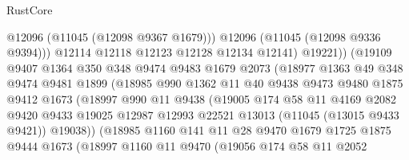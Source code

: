 \begin{lexlean}{RustCore}
\begin{coremodule}
                              @12096
                              (@11045 (@12098 @9367 @1679)))
                            @12096
                            (@11045 (@12098 @9336 @9394)))
                          @12114
                          @12118
                          @12123
                          @12128
                          @12134
                          @12141)
                        @19221))
                    (@19109
                      @9407
                      @1364
                      @350
                      @348
                      @9474
                      @9483
                      @1679
                      @2073
                      (@18977
                        @1363
                        @49
                        @348
                        @9474
                        @9481
                        @1899
                        (@18985
                          @990
                          @1362
                          @11
                          @40
                          @9438
                          @9473
                          @9480
                          @1875
                          @9412
                          @1673
                          (@18997
                            @990
                            @11
                            @9438
                            (@19005
                              @174
                              @58
                              @11
                              @4169
                              @2082
                              @9420
                              @9433
                              @19025
                              @12987
                              @12993
                              @22521
                              @13013
                              (@11045 (@13015 @9433 @9421))
                              @19038))
                          (@18985
                            @1160
                            @141
                            @11
                            @28
                            @9470
                            @1679
                            @1725
                            @1875
                            @9444
                            @1673
                            (@18997
                              @1160
                              @11
                              @9470
                              (@19056
                                @174
                                @58
                                @11
                                @2052

\end{coremodule}
\end{lexlean}
